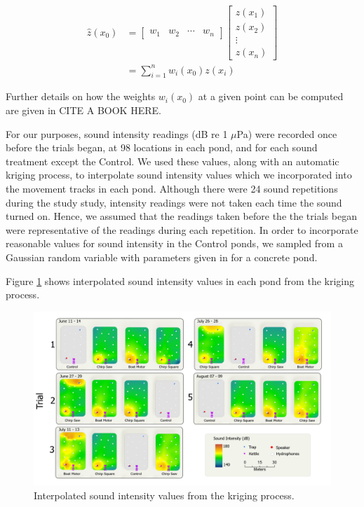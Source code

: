\documentclass[12pt]{article}
\begin{document}
			\begin{align*}
				\hat z(x_0) &= \begin{bmatrix} w_1 & w_2 & \cdots & w_n \end{bmatrix} \begin{bmatrix} z(x_1) \\ z(x_2) \\ \vdots \\ z(x_n) \end{bmatrix} \\
				&= \sum_{i = 1}^n w_i(x_0) z(x_i)
			\end{align*}
			
			Further details on how the weights $w_i(x_0)$ at a given point can be computed are given in CITE A BOOK HERE.
			
			For our purposes, sound intensity readings (dB re 1 $\mu$Pa) were recorded once before the trials began, at 98 locations in each pond, and for each sound treatment except the Control. We used these values, along with an automatic kriging process, to interpolate sound intensity values which we incorporated into the movement tracks in each pond. Although there were 24 sound repetitions during the study study, intensity readings were not taken each time the sound turned on. Hence, we assumed that the readings taken before the the trials began were representative of the readings during each repetition. In order to incorporate reasonable values for sound intensity in the Control ponds, we sampled from a Gaussian random variable with parameters given in \cite{Wysocki2007} for a concrete pond.
			
			Figure \ref{img:intensities} shows interpolated sound intensity values in each pond from the kriging process.
			
			\begin{figure}[H]
				\includegraphics[width=\textwidth]{intensities.png}
				\caption{Interpolated sound intensity values from the kriging process.}
				\label{img:intensities}
			\end{figure}		
\end{document}
